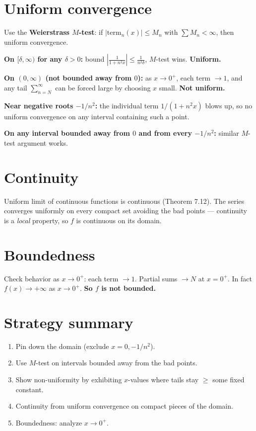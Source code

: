 \documentclass[12pt]{article}
\begin{document}
\section*{Uniform convergence}
Use the \textbf{Weierstrass $M$-test}: if $|\text{term}_n(x)| \leq M_n$ with $\sum M_n < \infty$, then uniform convergence.

\textbf{On $[\delta, \infty)$ for any $\delta > 0$:} bound $\left|\frac{1}{1+n^2 x}\right| \leq \frac{1}{n^2 \delta}$, $M$-test wins. \textbf{Uniform.}

\textbf{On $(0, \infty)$ (not bounded away from $0$):} as $x \to 0^+$, each term $\to 1$, and any tail $\sum_{n=N}^\infty$ can be forced large by choosing $x$ small. \textbf{Not uniform.}

\textbf{Near negative roots $-1/n^2$:} the individual term $1/(1+n^2 x)$ blows up, so no uniform convergence on any interval containing such a point.

\textbf{On any interval bounded away from $0$ and from every $-1/n^2$:} similar $M$-test argument works.

\section*{Continuity}
Uniform limit of continuous functions is continuous (Theorem 7.12). The series converges uniformly on every compact set avoiding the bad points --- continuity is a \emph{local} property, so $f$ is continuous on its domain.

\section*{Boundedness}
Check behavior as $x \to 0^+$: each term $\to 1$. Partial sums $\to N$ at $x = 0^+$. In fact $f(x) \to +\infty$ as $x \to 0^+$. \textbf{So $f$ is not bounded.}

\section*{Strategy summary}
\begin{enumerate}
  \item Pin down the domain (exclude $x = 0, -1/n^2$).
  \item Use $M$-test on intervals bounded away from the bad points.
  \item Show non-uniformity by exhibiting $x$-values where tails stay $\geq$ some fixed constant.
  \item Continuity from uniform convergence on compact pieces of the domain.
  \item Boundedness: analyze $x \to 0^+$.
\end{enumerate}
\end{document}

